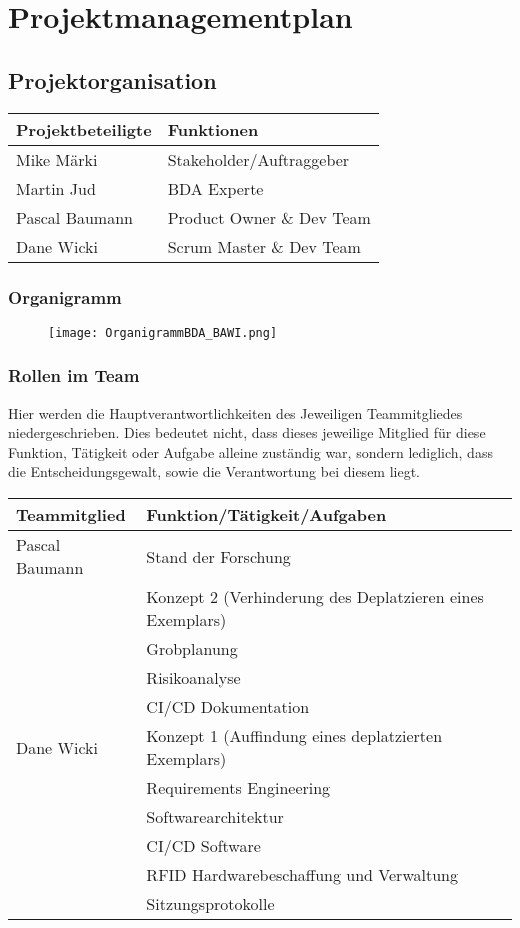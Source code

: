 \chapter{Projektmanagementplan}

\section{Projektorganisation}

\vspace{1em}

\begin{tabularx}{\textwidth}{|X|X|}
	\hline
	\textbf{Projektbeteiligte} & \textbf{Funktionen} \\
	\hline
	Mike Märki & Stakeholder/Auftraggeber \\
	\hline
	Martin Jud & BDA Experte \\
	\hline
	Pascal Baumann & Product Owner \& Dev Team \\
	\hline
	Dane Wicki & Scrum Master \& Dev Team \\
	\hline
\end{tabularx}

\subsection{Organigramm}
\begin{figure}[h!]
	\centering
	\texttt{[image: OrganigrammBDA\_BAWI.png]}
\end{figure}

\subsection{Rollen im Team}
Hier werden die Hauptverantwortlichkeiten des Jeweiligen Teammitgliedes niedergeschrieben. Dies bedeutet nicht, dass dieses jeweilige Mitglied für diese Funktion, Tätigkeit oder Aufgabe alleine zuständig war, sondern lediglich, dass die Entscheidungsgewalt, sowie die Verantwortung bei diesem liegt.

\begin{tabularx}{\textwidth}{|l|X|}
	\hline
	\textbf{Teammitglied} & \textbf{Funktion/Tätigkeit/Aufgaben} \\
	\hline
	Pascal Baumann & Stand der Forschung \\
		& Konzept 2 (Verhinderung des Deplatzieren eines Exemplars) \\
		& Grobplanung \\
		& Risikoanalyse \\
		& CI/CD Dokumentation \\
	\hline
	Dane Wicki & Konzept 1 (Auffindung eines deplatzierten Exemplars)\\
		& Requirements Engineering \\
		& Softwarearchitektur \\
		& CI/CD Software \\
		& RFID Hardwarebeschaffung und Verwaltung \\
		& Sitzungsprotokolle \\
	\hline
\end{tabularx}

